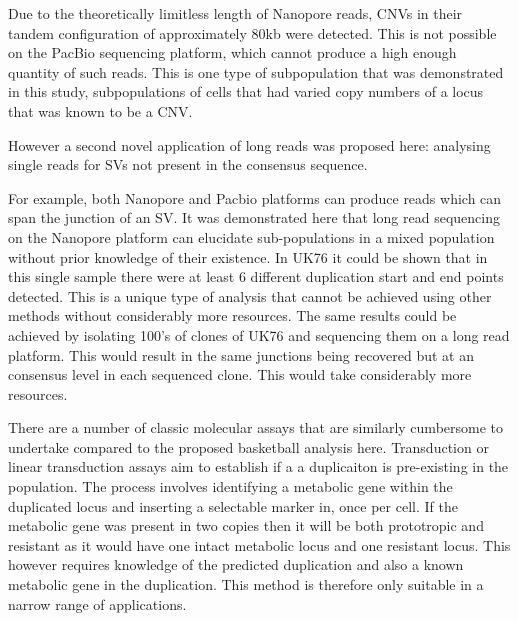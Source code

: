 \documentclass{article}
\begin{document}
Due to the theoretically limitless length of Nanopore reads, CNVs in their tandem configuration of approximately 80kb were detected. This is not possible on the PacBio sequencing platform, which cannot produce a high enough quantity of such reads. This is one type of subpopulation that was demonstrated in this study, subpopulations of cells that had varied copy numbers of a locus that was known to be a CNV. 


However a second novel application of long reads was proposed here: analysing single reads for SVs not present in the consensus sequence. 

For example, both Nanopore and Pacbio platforms can produce reads which can span the junction of an SV. It was demonstrated here that long read sequencing on the Nanopore platform can elucidate sub-populations in a mixed population without prior knowledge of their existence. In UK76 it could be shown that in this single sample there were at least 6 different duplication start and end points detected. This is a unique type of analysis that cannot be achieved using other methods without considerably more resources. The same results could be achieved by isolating 100's of clones of UK76 and sequencing them on a long read platform. This would result in the same junctions being recovered but at an consensus level in each sequenced clone. This would take considerably more resources. 

There are a number of classic molecular assays that are similarly cumbersome to undertake compared to the proposed basketball analysis here. Transduction or linear transduction assays aim to establish if a a duplicaiton is pre-existing in the population. The process involves identifying a metabolic gene within the duplicated locus and inserting a selectable marker in, once per cell. If the metabolic gene was present in two copies then it will be both prototropic and resistant as it would have one intact metabolic locus and one resistant locus. This however requires knowledge of the predicted duplication and also a known metabolic gene in the duplication. This method is therefore only suitable in a narrow range of applications.








%
\end{document}
